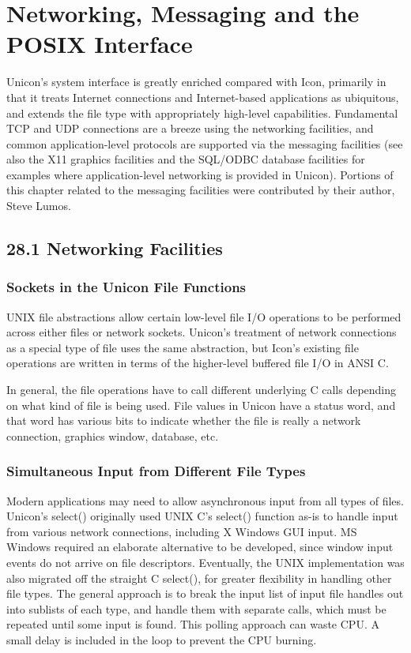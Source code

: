 \chapter{Networking, Messaging and the POSIX Interface}

Unicon's system interface is greatly enriched compared with Icon,
primarily in that it treats Internet connections and Internet-based
applications as ubiquitous, and extends the file type with
appropriately high-level capabilities.  Fundamental TCP and UDP
connections are a breeze using the networking facilities, and common
application-level protocols are supported via the messaging facilities
(see also the X11 graphics facilities and the SQL/ODBC database
facilities for examples where application-level networking is provided
in Unicon). Portions of this chapter related to the messaging
facilities were contributed by their author, Steve Lumos.

\section[28.1 Networking Facilities]{28.1 Networking Facilities}

\subsection{Sockets in the Unicon File Functions}

UNIX file abstractions allow certain low-level file I/O
operations to be performed across either files or network sockets.
Unicon's treatment of network connections as a special type of file
uses the same abstraction, but Icon's existing file operations are
written in terms of the higher-level buffered file I/O in ANSI C.

In general, the file operations have to call different underlying C calls 
depending on what kind of file is being used.  File values in Unicon
have a status word, and that word has various bits to indicate whether
the file is really a network connection, graphics window, database, etc.

\subsection{Simultaneous Input from Different File Types}

Modern applications may need to allow asynchronous input from all
types of files. Unicon's select() originally used UNIX C's select()
function as-is to handle input from various network connections,
including X Windows GUI input.  MS Windows required an elaborate
alternative to be developed, since window input events do not
arrive on file descriptors.  Eventually, the UNIX implementation
was also migrated off the straight C select(), for greater flexibility
in handling other file types.  The general approach is to break the
input list of input file handles out into sublists of each type, and
handle them with separate calls, which must be repeated until some
input is found.  This polling approach can waste CPU. A small delay
is included in the loop to prevent the CPU burning.


